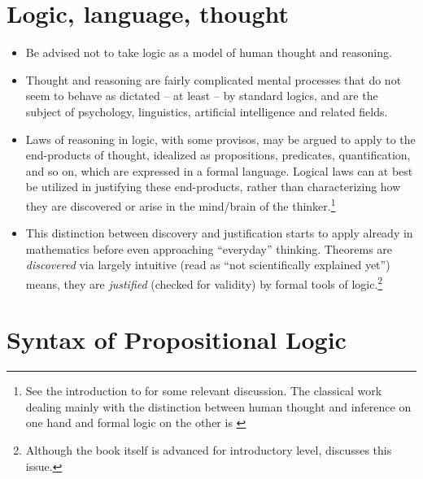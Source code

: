\documentclass[11pt]{article}
\begin{document}
\tableofcontents
\newpage
\section{Logic, language, thought}
\begin{itemize}
\item Be advised not to take logic as a model of human thought and reasoning.
\item Thought and reasoning are fairly complicated mental processes that do not
seem to behave as dictated -- at least -- by standard logics, and are the
subject of psychology, linguistics, artificial intelligence and
related fields. 

\item Laws of reasoning in logic, with some provisos, may be argued to apply to the end-products of thought,
idealized as propositions, predicates, quantification, and so on, which are
expressed in a formal language.
Logical laws can at best be utilized in justifying these end-products, rather
than characterizing how they are discovered or arise in the mind/brain of the
thinker.\footnote{See the introduction to \cite{reichenbach47} for some relevant
discussion. The classical work dealing mainly with the distinction between
human thought and inference on one hand and formal logic on the other is
\cite{johnsonlaird83}}
\item This distinction between discovery and justification starts to apply
already in mathematics before even approaching 	``everyday'' thinking. Theorems are
\textit{discovered} via largely intuitive (read as ``not scientifically explained
yet'') means, they are \textit{justified} (checked for validity) by formal tools
of logic.\footnote{Although the book itself is advanced for introductory level,
\cite[\S 16]{quine40} discusses this issue.}

\end{itemize}


\section{Syntax of Propositional Logic}
\label{induc}
\end{document}
